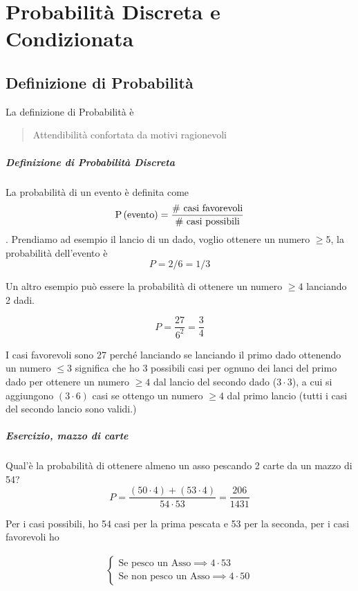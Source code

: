 \chapter{Probabilità Discreta e Condizionata}

\section{Definizione di Probabilità}

La definizione di Probabilità è

\begin{quote}
	Attendibilità confortata da motivi ragionevoli
\end{quote}

\paragraph{Definizione di Probabilità Discreta}

La probabilità di un evento è definita come \[ \text{P}\left(\text{evento}\right) = \dfrac{\text{\# casi favorevoli}}{\text{\# casi possibili}}  \]. Prendiamo ad esempio il lancio di un dado, voglio ottenere un numero $ \geq 5 $, la probabilità dell'evento è
\[ P = 2/6 = 1/3  \]

Un altro esempio può essere la probabilità di ottenere un numero $ \geq 4 $ lanciando 2 dadi.

\[ P = \dfrac{27}{6^2} = \dfrac{3}{4} \]

I casi favorevoli sono 27 perché lanciando se lanciando il primo dado ottenendo un numero $ \leq 3 $ significa che ho 3 possibili casi per ognuno dei lanci del primo dado per ottenere un numero $ \geq 4 $ dal lancio del secondo dado ($ 3 \cdot 3 $), a cui si aggiungono $ (3 \cdot 6) $ casi se ottengo un numero $ \geq 4 $ dal primo lancio (tutti i casi del secondo lancio sono validi.)

\paragraph{Esercizio, mazzo di carte}

Qual'è la probabilità di ottenere almeno un asso pescando 2 carte da un mazzo di 54?
\[ P = \dfrac{(50 \cdot 4) + (53 \cdot 4)}{54 \cdot 53} = \dfrac{206}{1431}\]

Per i casi possibili, ho 54 casi per la prima pescata e 53 per la seconda, per i casi favorevoli ho

\begin{align}
	\begin{cases}
		\text{Se pesco un Asso} \implies 4 \cdot 53 \\
		\text{Se non pesco un Asso} \implies 4 \cdot 50
	\end{cases}
\end{align}

